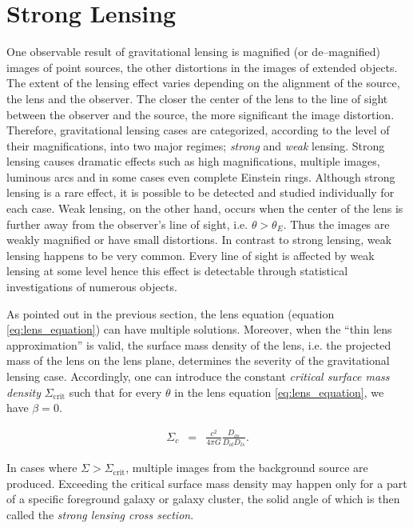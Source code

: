 \documentclass[a4wide,12pt]{book}
\begin{document}
\section{Strong Lensing}
One observable result of gravitational lensing is magnified (or de--magnified) images of point sources, the other distortions in the images of extended objects. The extent of the lensing effect varies depending on the alignment of the source, the lens and the observer. The closer the center of the lens to the line of sight between the observer and the source, the more significant the image distortion. Therefore, gravitational lensing cases are categorized, according to the level of their magnifications, into two major regimes; \emph{strong} and \emph{weak} lensing. Strong lensing causes dramatic effects such as high magnifications, multiple images, luminous arcs and in some cases even complete Einstein rings. Although strong lensing is a rare effect, it is possible to be detected and studied individually for each case. Weak lensing, on the other hand, occurs when the center of the lens is further away from the observer's line of sight, i.e. $\theta > \theta_E$. Thus the images are weakly magnified or have small distortions. In contrast to strong lensing, weak lensing happens to be very common. Every line of sight is affected by weak lensing at some level hence this effect is detectable through statistical investigations of numerous objects. 

As pointed out in the previous section, the lens equation (equation \ref{eq:lens_equation}) can have multiple solutions. Moreover, when the ``thin lens approximation'' is valid, the surface mass density of the lens, i.e. the projected mass of the lens on the lens plane, determines the severity of the gravitational lensing case. Accordingly, one can introduce the constant \emph{critical surface mass density} $\Sigma_{\mathrm{crit}}$ such that for every $\theta$ in the lens equation \ref{eq:lens_equation}, we have $\beta = 0$.

\begin{eqnarray}
\label{eq:Sigma_crit}
\Sigma_c &=& \frac{c^2}{4 \pi G}\frac{D_{os}}{D_{ol} D_{ls}}.
\end{eqnarray}

In cases where $\Sigma > \Sigma_{\mathrm{crit}}$, multiple images from the background source are produced. Exceeding the critical surface mass density may happen only for a part of a specific foreground galaxy or galaxy cluster, the solid angle of which is then called the \emph{strong lensing cross section}. 
\end{document}

